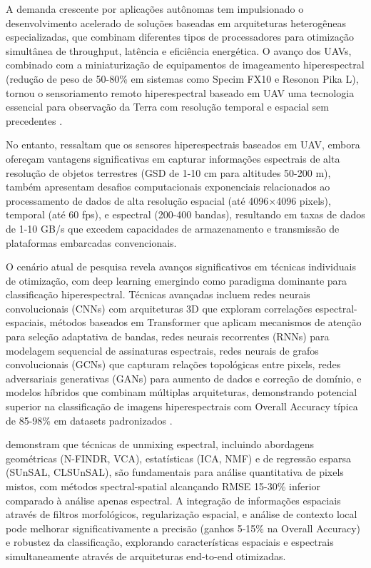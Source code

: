 A demanda crescente por aplicações autônomas tem impulsionado o desenvolvimento 
acelerado de soluções baseadas em arquiteturas heterogêneas especializadas, 
que combinam diferentes tipos de processadores para otimização simultânea de 
throughput, latência e eficiência energética. O avanço dos UAVs, combinado 
com a miniaturização de equipamentos de imageamento hiperespectral (redução 
de peso de 50-80\% em sistemas como Specim FX10 e Resonon Pika L), tornou o 
sensoriamento remoto hiperespectral baseado em UAV uma tecnologia essencial 
para observação da Terra com resolução temporal e espacial sem precedentes 
\cite{Zhang2024}. 

No entanto, \textcite{Zhang2024} ressaltam que os sensores hiperespectrais 
baseados em UAV, embora ofereçam vantagens significativas em capturar 
informações espectrais de alta resolução de objetos terrestres (GSD de 
1-10 cm para altitudes 50-200 m), também apresentam desafios computacionais 
exponenciais relacionados ao processamento de dados de alta resolução 
espacial (até 4096×4096 pixels), temporal (até 60 fps), e espectral 
(200-400 bandas), resultando em taxas de dados de 1-10 GB/s que excedem 
capacidades de armazenamento e transmissão de plataformas embarcadas 
convencionais.

O cenário atual de pesquisa revela avanços significativos em técnicas 
individuais de otimização, com deep learning emergindo como paradigma 
dominante para classificação hiperespectral. Técnicas avançadas incluem 
redes neurais convolucionais (CNNs) com arquiteturas 3D que exploram 
correlações espectral-espaciais, métodos baseados em Transformer que 
aplicam mecanismos de atenção para seleção adaptativa de bandas, redes 
neurais recorrentes (RNNs) para modelagem sequencial de assinaturas 
espectrais, redes neurais de grafos convolucionais (GCNs) que capturam 
relações topológicas entre pixels, redes adversariais generativas (GANs) 
para aumento de dados e correção de domínio, e modelos híbridos que 
combinam múltiplas arquiteturas, demonstrando potencial superior na 
classificação de imagens hiperespectrais com Overall Accuracy típica 
de 85-98\% em datasets padronizados \cite{Zhang2024}.

\textcite{BioucasDias2012} demonstram que técnicas de unmixing espectral, 
incluindo abordagens geométricas (N-FINDR, VCA), estatísticas (ICA, NMF) 
e de regressão esparsa (SUnSAL, CLSUnSAL), são fundamentais para análise 
quantitativa de pixels mistos, com métodos spectral-spatial alcançando 
RMSE 15-30\% inferior comparado à análise apenas espectral. A integração 
de informações espaciais através de filtros morfológicos, regularização 
espacial, e análise de contexto local pode melhorar significativamente 
a precisão (ganhos 5-15\% na Overall Accuracy) e robustez da classificação, 
explorando características espaciais e espectrais simultaneamente através 
de arquiteturas end-to-end otimizadas.

